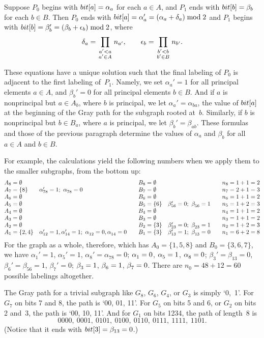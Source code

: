 Suppose $P_0$ begins with $\\{bit}[a]=\alpha_a$ for each $a\in A$,
and $P_1$ ends with $\\{bit}[b]=\beta_b$ for each $b\in B$. Then $P_0$
ends with $\\{bit}[a]=\alpha_a'=(\alpha_a+\delta_a)\bmod 2$ and $P_1$ begins
with $\\{bit}[b]=\beta_b'=(\beta_b+\epsilon_b)\bmod 2$, where
$$\delta_a=\prod_{\scriptstyle a'<a\atop\scriptstyle a'\in A} n_{a'},\qquad
\epsilon_b=\prod_{\scriptstyle b'<b\atop\scriptstyle b'\in B} n_{b'}.$$

These equations have a unique solution such that
the final labeling of $P_0$ is adjacent to the first labeling of~$P_1$.
Namely, we set $\alpha_a'=1$ for all principal elements $a\in A$,
and $\beta_b'=0$ for all principal elements $b\in B$. And if $a$ is
nonprincipal but $a\in A_b$, where $b$ is principal, we let
$\alpha_a'=\alpha_{ba}$, the value of $\\{bit}[a]$ at the beginning
of the Gray path for the subgraph rooted at~$b$. Similarly, if $b$ is
nonprincipal but $b\in B_a$, where $a$ is principal, we let
$\beta_b'=\beta_{ab}$. These formulas and those of the
previous paragraph determine the values of $\alpha_a$ and $\beta_b$
for all $a\in A$ and $b\in B$.

For example, the calculations yield the following numbers when
we apply them to the smaller subgraphs, from the bottom up:
$$\vbox{\halign{$#\hfill$&&\quad$#\hfill$&\qquad$#\hfill$\cr
A_8=\emptyset&&B_8=\emptyset&&n_8=1+1=2\cr
A_7=\{8\}&\alpha_{78}'=1;\ \alpha\losub{78}=0&B_7=\emptyset&&n_7=2+1=3\cr
A_6=\emptyset&&B_6=\emptyset&&n_6=1+1=2\cr
A_5=\emptyset&&B_5=\{6\}&\beta_{56}'=0;\ \beta\losub{56}=1&n_5=1+2=3\cr
A_4=\emptyset&&B_4=\emptyset&&n_4=1+1=2\cr
A_3=\emptyset&&B_3=\emptyset&&n_3=1+1=2\cr
A_2=\emptyset&&B_2=\{3\}&\beta_{23}'=0;\ \beta\losub{23}=1&n_2=1+2=3\cr
A_1=\{2,4\}&\alpha_{12}'=1,\alpha_{14}'=1;\ \alpha\losub{12}=0,
\alpha\losub{14}=0&
B_1=\{3\}&\beta_{13}'=1;\ \beta\losub{13}=0&n_1=6+2=8\cr}}$$
For the graph as a whole, therefore, which has
$A_0=\{1,5,8\}$ and $B_0=\{3,6,7\}$, we have
$\alpha_1'=1$, $\alpha_5'=1$, $\alpha_8'=\alpha_{78}=0$;
$\alpha\losub1=0$, $\alpha\losub5=1$, $\alpha\losub8=0$;
$\beta_3'=\beta_{13}=0$, $\beta_6'=\beta_{56}=1$, $\beta_7'=0$;
$\beta\losub3=1$, $\beta\losub6=1$, $\beta\losub7=0$. There are
$n_0=48+12=60$ possible labelings altogether.

The Gray path for a trivial subgraph like $G_8$, $G_6$, $G_4$, or $G_3$
is simply `0,~1'. For $G_7$ on bits 7 and 8, the path is
`00, 01, 11'. For $G_5$ on bits 5 and 6, or $G_2$ on bits 2 and~3,
the path is `00, 10, 11'. And for $G_1$ on bits 1234, the path of length~8 is
$$0000,\ 0001,\ 0101,\ 0100,\ 0110,\ 0111,\ 1111,\ 1101.$$
(Notice that it ends with $\\{bit}[3]=\beta_{13}=0$.)

